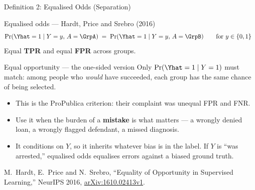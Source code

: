 \begin{frame}[allowframebreaks]{Definition 2: Equalised Odds (Separation)}

    \begin{block}{Equalised odds --- Hardt, Price and Srebro (2016)}
        \[
            \Pr(\Yhat = 1 \mid Y = y,\, A = \GrpA) \;=\; \Pr(\Yhat = 1 \mid Y = y,\, A = \GrpB)
            \qquad \text{for } y \in \{0,1\}
        \]
        Equal \textbf{TPR} and equal \textbf{FPR} across groups.
    \end{block}

    \vspace{0.5em}

    \begin{block}{Equal opportunity --- the one-sided version}
        Only $\Pr(\Yhat = 1 \mid Y = 1)$ must match: among people who \emph{would} have succeeded,
        each group has the same chance of being selected.
    \end{block}

    \vspace{0.6em}

    \begin{itemize}\small
        \setlength\itemsep{0.35em}
        \item This is the ProPublica criterion: their complaint was unequal FPR and FNR.
        \item Use it when the burden of a \textbf{mistake} is what matters --- a wrongly denied
              loan, a wrongly flagged defendant, a missed diagnosis.
        \item It conditions on $Y$, so it inherits whatever bias is in the label. If $Y$ is
              ``was arrested,'' equalised odds equalises errors against a biased ground truth.
    \end{itemize}

    \vspace{0.3em}
    {\scriptsize M.~Hardt, E.~Price and N.~Srebro, ``Equality of Opportunity in Supervised Learning,''
    NeurIPS 2016, \href{https://arxiv.org/abs/1610.02413v1}{arXiv:1610.02413v1}.}
\end{frame}


